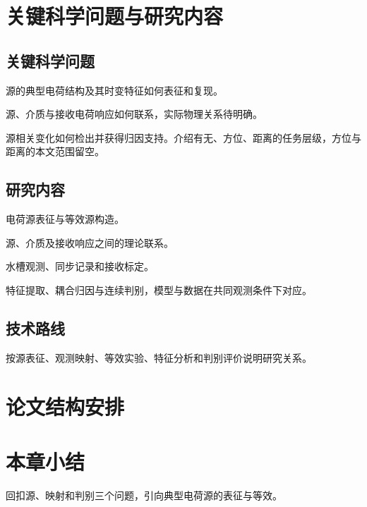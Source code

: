 \section{关键科学问题与研究内容}
\subsection{关键科学问题}
\begin{paragraphplan}
\item 源的典型电荷结构及其时变特征如何表征和复现。
\item 源、介质与接收电荷响应如何联系，实际物理关系待明确。
\item 源相关变化如何检出并获得归因支持。介绍有无、方位、距离的任务层级，方位与距离的本文范围留空。
\end{paragraphplan}
\subsection{研究内容}
\begin{paragraphplan}
\item 电荷源表征与等效源构造。
\item 源、介质及接收响应之间的理论联系。
\item 水槽观测、同步记录和接收标定。
\item 特征提取、耦合归因与连续判别，模型与数据在共同观测条件下对应。
\end{paragraphplan}
\subsection{技术路线}
\begin{paragraphplan}
\item 按源表征、观测映射、等效实验、特征分析和判别评价说明研究关系。
\end{paragraphplan}

\section{论文结构安排}

\section{本章小结}
\begin{paragraphplan}
\item 回扣源、映射和判别三个问题，引向典型电荷源的表征与等效。
\end{paragraphplan}

